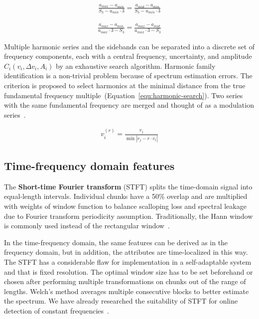 \begin{ceqn}\begin{align}
\frac{a_{max} - a_{min}}{S_3 - a_{min} \cdot 3} = \frac{a_{mid} - a_{min}}{S_3 - a_{min} \cdot 3}
\label{equ:mms-maxima}
\end{align}\end{ceqn}

\begin{ceqn}\begin{align}
\frac{a_{max} - a_{min}}{a_{max} \cdot 3 - S_3} = \frac{a_{max} - a_{mid}}{a_{max} \cdot 3 - S_3}
\label{equ:mms-minima}
 \end{align}\end{ceqn}

Multiple harmonic series and the sidebands can be separated into a discrete set of frequency components, each with a central frequency, uncertainty, and amplitude $C_i(v_i, \Delta v_i, A_i)$ by an exhaustive search algorithm. Harmonic family identification is a non-trivial problem because of spectrum estimation errors. The criterion is proposed to select harmonics at the minimal distance from the true fundamental frequency multiple~(Equation~\ref{equ:harmonic-search}). Two series with the same fundamental frequency are merged and thought of as a modulation series~\cite{gerber_identification_2013}.

\begin{ceqn}\begin{align}
v_i^{(r)} = \frac{v_j}{\min{|v_j - r \cdot v_i|}}
\label{equ:harmonic-search}
\end{align}\end{ceqn}

\subsection{Time-frequency domain features}
The \textbf{Short-time Fourier transform} (STFT) splits the time-domain signal into equal-length intervals. Individual chunks have a 50\% overlap and are multiplied with weights of window function to balance scalloping loss and spectral leakage due to Fourier transform periodicity assumption. Traditionally, the Hann window is commonly used instead of the rectangular window~\cite{ziaran_technicka_2013,noauthor_iso_2016_2}.

In the time-frequency domain, the same features can be derived as in the frequency domain, but in addition, the attributes are time-localized in this way. The STFT has a considerable flaw for implementation in a self-adaptable system and that is fixed resolution. The optimal window size has to be set beforehand or chosen after performing multiple transformations on chunks out of the range of lengths. Welch's method averages multiple consecutive blocks to better estimate the spectrum. We have already researched the suitability of STFT for online detection of constant frequencies~\cite{hajek_iot_2022}.

